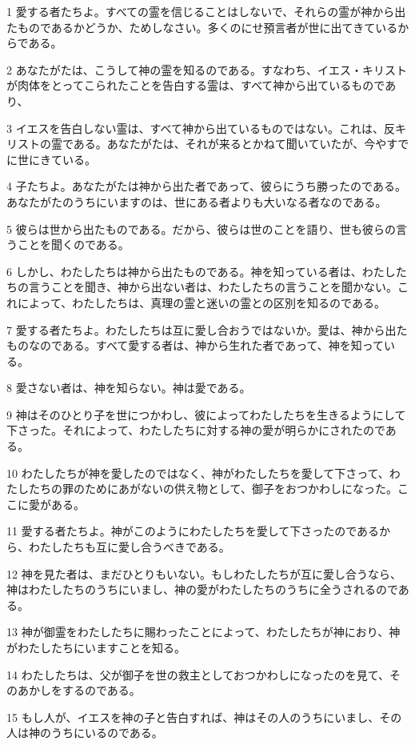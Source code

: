 \par 1 愛する者たちよ。すべての霊を信じることはしないで、それらの霊が神から出たものであるかどうか、ためしなさい。多くのにせ預言者が世に出てきているからである。
\par 2 あなたがたは、こうして神の霊を知るのである。すなわち、イエス・キリストが肉体をとってこられたことを告白する霊は、すべて神から出ているものであり、
\par 3 イエスを告白しない霊は、すべて神から出ているものではない。これは、反キリストの霊である。あなたがたは、それが来るとかねて聞いていたが、今やすでに世にきている。
\par 4 子たちよ。あなたがたは神から出た者であって、彼らにうち勝ったのである。あなたがたのうちにいますのは、世にある者よりも大いなる者なのである。
\par 5 彼らは世から出たものである。だから、彼らは世のことを語り、世も彼らの言うことを聞くのである。
\par 6 しかし、わたしたちは神から出たものである。神を知っている者は、わたしたちの言うことを聞き、神から出ない者は、わたしたちの言うことを聞かない。これによって、わたしたちは、真理の霊と迷いの霊との区別を知るのである。
\par 7 愛する者たちよ。わたしたちは互に愛し合おうではないか。愛は、神から出たものなのである。すべて愛する者は、神から生れた者であって、神を知っている。
\par 8 愛さない者は、神を知らない。神は愛である。
\par 9 神はそのひとり子を世につかわし、彼によってわたしたちを生きるようにして下さった。それによって、わたしたちに対する神の愛が明らかにされたのである。
\par 10 わたしたちが神を愛したのではなく、神がわたしたちを愛して下さって、わたしたちの罪のためにあがないの供え物として、御子をおつかわしになった。ここに愛がある。
\par 11 愛する者たちよ。神がこのようにわたしたちを愛して下さったのであるから、わたしたちも互に愛し合うべきである。
\par 12 神を見た者は、まだひとりもいない。もしわたしたちが互に愛し合うなら、神はわたしたちのうちにいまし、神の愛がわたしたちのうちに全うされるのである。
\par 13 神が御霊をわたしたちに賜わったことによって、わたしたちが神におり、神がわたしたちにいますことを知る。
\par 14 わたしたちは、父が御子を世の救主としておつかわしになったのを見て、そのあかしをするのである。
\par 15 もし人が、イエスを神の子と告白すれば、神はその人のうちにいまし、その人は神のうちにいるのである。

